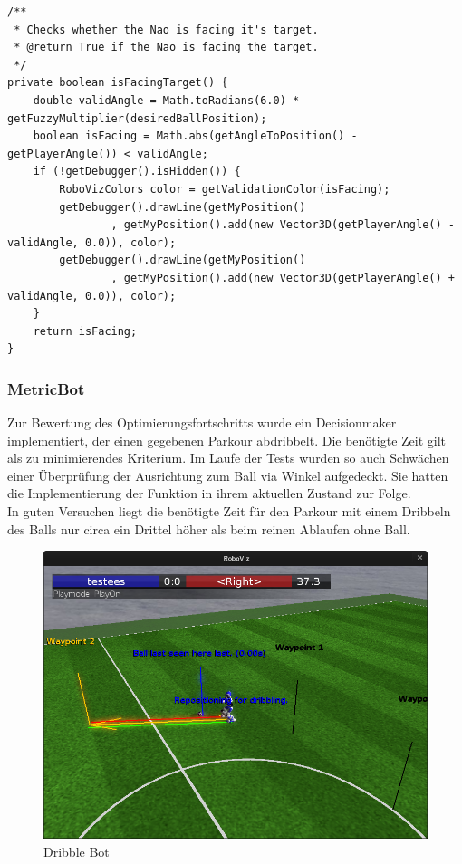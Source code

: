 \begin{lstlisting}[caption=Ausrichtung zum Ziel, captionpos=b, label=lst:facing-target]
/**
 * Checks whether the Nao is facing it's target.
 * @return True if the Nao is facing the target.
 */
private boolean isFacingTarget() {
    double validAngle = Math.toRadians(6.0) * getFuzzyMultiplier(desiredBallPosition);
    boolean isFacing = Math.abs(getAngleToPosition() - getPlayerAngle()) < validAngle;
    if (!getDebugger().isHidden()) {
        RoboVizColors color = getValidationColor(isFacing);
        getDebugger().drawLine(getMyPosition()
                , getMyPosition().add(new Vector3D(getPlayerAngle() - validAngle, 0.0)), color);
        getDebugger().drawLine(getMyPosition()
                , getMyPosition().add(new Vector3D(getPlayerAngle() + validAngle, 0.0)), color);
    }
    return isFacing;
}
\end{lstlisting}

\subsubsection{MetricBot}
Zur Bewertung des Optimierungsfortschritts wurde ein Decisionmaker implementiert, der einen gegebenen Parkour abdribbelt. Die benötigte Zeit gilt als zu minimierendes Kriterium. Im Laufe der Tests wurden so auch Schwächen einer Überprüfung der Ausrichtung zum Ball via Winkel aufgedeckt. Sie hatten die Implementierung der Funktion in ihrem aktuellen Zustand zur Folge.\\
In guten Versuchen liegt die benötigte Zeit für den Parkour mit einem Dribbeln des Balls nur circa ein Drittel höher als beim reinen Ablaufen ohne Ball.

\begin{figure}[H]
	\centering
	\includegraphics[width=\ScaleIfNeeded]{Grafiken/Dribble/DribbleRektReposition}
	\caption{Dribble Bot}
	\label{fig:dribblerekt}
\end{figure}